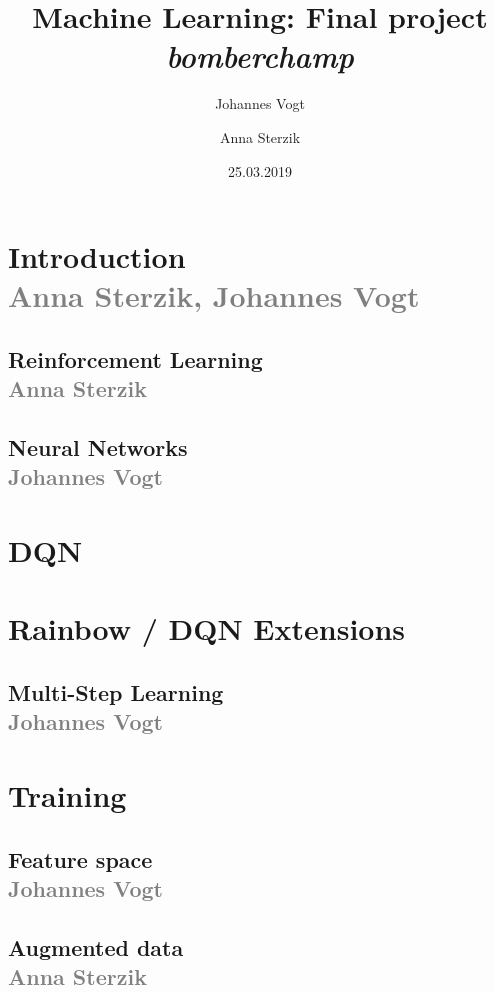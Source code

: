 \documentclass[12pt]{article}
\title{Machine Learning: Final project \emph{bomberchamp}}
\author{Johannes Vogt\and Anna Sterzik}
\date{25.03.2019}
\begin{document}
\maketitle


\def\anna{\\\small{\textcolor{gray}{Anna Sterzik}}}
\def\johannes{\\\small{\textcolor{gray}{Johannes Vogt}}}
\def\both{\\\small{\textcolor{gray}{Anna Sterzik, Johannes Vogt}}}


\section{Introduction\both}


\subsection{Reinforcement Learning\anna}

\subsection{Neural Networks\johannes}


\section{DQN}


\section{Rainbow / DQN Extensions}

\subsection{Multi-Step Learning\johannes} %
% 


\section{Training}
\subsection{Feature space\johannes}

\subsection{Augmented data\anna}   %

\end{document}
